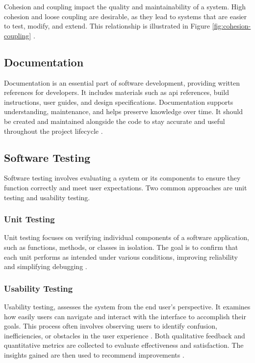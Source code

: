 Cohesion and coupling impact the quality and maintainability of a system.
High cohesion and loose coupling are desirable, as they lead to systems that are easier to test, modify, and extend. This relationship is illustrated in Figure \ref{fig:cohesion-coupling} 
\cite{geeksforgeeks:c&c}.

\subsection{Documentation}
\label{subsec:documentation}

Documentation is an essential part of software development, providing written references for developers. It includes materials such as \gls{api} references, build instructions, user guides, and design specifications. Documentation supports understanding, maintenance, and helps preserve knowledge over time. It should be created and maintained alongside the code to stay accurate and useful throughout the project lifecycle \cite{geeksforgeeks:doc}.

\subsection{Software Testing}
\label{subsec:testing}

Software testing involves evaluating a system or its components to ensure they function correctly and meet user expectations. Two common approaches are unit testing and usability testing. \\

\subsubsection*{Unit Testing}

Unit testing focuses on verifying individual components of a software application, such as functions, methods, or classes in isolation. The goal is to confirm that each unit performs as intended under various conditions, improving reliability and simplifying debugging \cite{geeksforgeeks:unit-test}. \\

\newpage

\subsubsection*{Usability Testing}

Usability testing, assesses the system from the end user’s perspective. It examines how easily users can navigate and interact with the interface to accomplish their goals. This process often involves observing users to identify confusion, inefficiencies, or obstacles in the user experience \cite{geeksforgeeks:user-test}. Both qualitative feedback and quantitative metrics are collected to evaluate effectiveness and satisfaction. The insights gained are then used to recommend improvements \cite{geeksforgeeks:user-test}.

